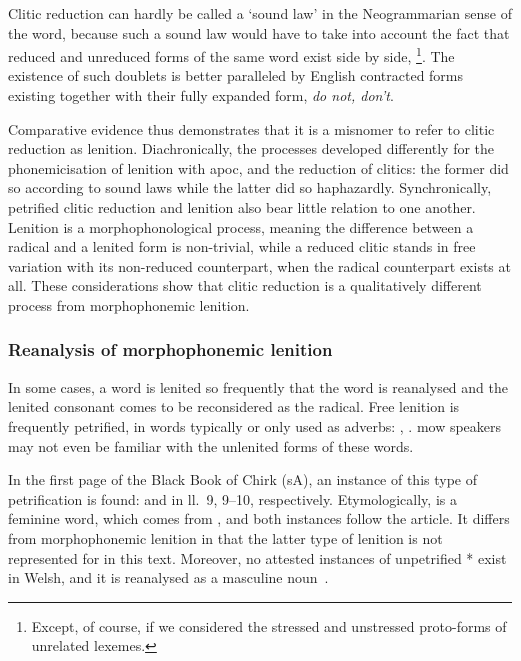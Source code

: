 Clitic reduction can hardly be called a `sound law' in the Neogrammarian sense of the word, because such a sound law would have to take into account the fact that reduced and unreduced forms of the same word  exist side by side, \eg {}\footnote{%
  Except, of course, if we considered the stressed and unstressed proto-forms of  unrelated lexemes.
}.
The existence of such doublets is better paralleled by English contracted forms existing together with their fully expanded form, \eg \emph{do not, don't}.


Comparative evidence thus demonstrates that it is a misnomer to refer to clitic reduction as lenition.
Diachronically, the processes developed differently for the phonemicisation of lenition with \gls{apoc}, and the reduction of clitics: the former did so according to sound laws while the latter did so haphazardly.
Synchronically, petrified clitic reduction and lenition also bear little relation to one another. Lenition is a morphophonological process, meaning the difference between a radical and a lenited form is non-trivial, while a reduced clitic stands in free variation with its non-reduced counterpart, when the radical counterpart exists at all. 
These considerations show that clitic reduction is a qualitatively different process from morphophonemic lenition. 

\subsubsection{Reanalysis of morphophonemic lenition}
\label{sec:rean-morph-lenit}
In some cases,  a word is lenited so frequently that the word is reanalysed and the lenited consonant comes to be reconsidered as the radical.
Free lenition is frequently petrified, \eg in words typically or only used as adverbs: , . \Gls{mow} speakers may not even be familiar with the unlenited forms of these words.



In the first page of the Black Book of Chirk (\gls{sA}), an instance of this type of petrification is found:  and  in ll.~9, 9--10, respectively. 
Etymologically,  is a feminine word, which comes from , and both instances follow the article. 
It differs from morphophonemic lenition in that the latter type of lenition is not represented for  in this text. 
Moreover, no attested instances of unpetrified  * exist in Welsh, and it is reanalysed as a masculine noun~\autocite[shown as eb.g.\ in][s.v.~]{bevan_geiriadur_2014}. 

